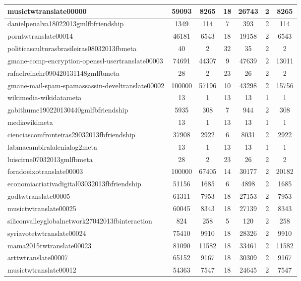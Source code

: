 \begin{table*}[h!]
\begin{center}
\begin{tabular}{| l | c | c | c | c | c | c |}
musictwtranslate00000 & 59093  & 8265  & 18  & 26743  & 2  & 8265 \\\hline
danielpenalva18022013gmlfbfriendship & 1349  & 114  & 7  & 393  & 2  & 114 \\\hline
porntwtranslate00014 & 46181  & 6543  & 18  & 19158  & 2  & 6543 \\\hline
politicasculturasbrasileiras08032013fbmeta & 40  & 2  & 32  & 35  & 2  & 2 \\\hline
gmane-comp-encryption-openssl-usertranslate00003 & 74691  & 44307  & 9  & 47639  & 2  & 13011 \\\hline
rafaelreinehr090420131148gmlfbmeta & 28  & 2  & 23  & 26  & 2  & 2 \\\hline
gmane-mail-spam-spamassassin-develtranslate00002 & 100000  & 57196  & 10  & 43298  & 2  & 15756 \\\hline
wikimedia-wikidatameta & 13  & 1  & 13  & 13  & 1  & 1 \\\hline
gabithume190220130440gmlfbfriendship & 5935  & 308  & 7  & 944  & 2  & 308 \\\hline
mediawikimeta & 13  & 1  & 13  & 13  & 1  & 1 \\\hline
cienciascomfronteiras29032013fbfriendship & 37908  & 2922  & 6  & 8031  & 2  & 2922 \\\hline
labmacambiralalenialog2meta & 13  & 1  & 13  & 13  & 1  & 1 \\\hline
luiscirne07032013gmlfbmeta & 28  & 2  & 23  & 26  & 2  & 2 \\\hline
foradoeixotranslate00003 & 100000  & 67405  & 14  & 30177  & 2  & 20182 \\\hline
economiacriativadigital03032013fbfriendship & 51156  & 1685  & 6  & 4898  & 2  & 1685 \\\hline
godtwtranslate00005 & 61311  & 7953  & 18  & 27153  & 2  & 7953 \\\hline
musictwtranslate00025 & 60045  & 8343  & 18  & 27139  & 2  & 8343 \\\hline
siliconvalleyglobalnetwork27042013fbinteraction & 824  & 258  & 5  & 120  & 2  & 258 \\\hline
syriavotetwtranslate00024 & 75410  & 9910  & 18  & 28326  & 2  & 9910 \\\hline
mama2015twtranslate00023 & 81090  & 11582  & 18  & 33461  & 2  & 11582 \\\hline
arttwtranslate00007 & 65152  & 9167  & 18  & 30309  & 2  & 9167 \\\hline
musictwtranslate00012 & 54363  & 7547  & 18  & 24645  & 2  & 7547 \\\hline

\end{tabular}
\end{center}
\end{table*}
